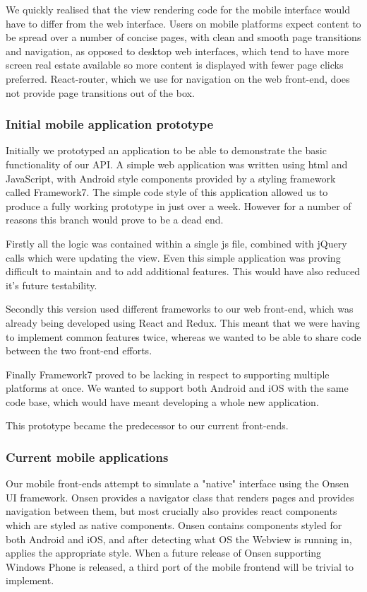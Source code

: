 We quickly realised that the view rendering code for the mobile interface would have to differ from the web interface. Users on mobile platforms expect content to be spread over a number of concise pages, with clean and smooth page transitions and navigation, as opposed to desktop web interfaces, which tend to have more screen real estate available so more content is displayed with fewer page clicks preferred. React-router, which we use for navigation on the web front-end, does not provide page transitions out of the box.

\subsubsection{Initial mobile application prototype}

Initially we prototyped an application to be able to demonstrate the basic functionality of our API. A simple web application was written using html and JavaScript, with Android style components provided by a styling framework called Framework7. The simple code style of this application allowed us to produce a fully working prototype in just over a week. However for a number of reasons this branch would prove to be a dead end. 

Firstly all the logic was contained within a single js file, combined with jQuery calls which were updating the view. Even this simple application was proving difficult to maintain and to add additional features. This would have also reduced it's future testability. 

Secondly this version used different frameworks to our web front-end, which was already being developed using React and Redux. This meant that we were having to implement common features twice, whereas we wanted to be able to share code between the two front-end efforts.

Finally Framework7 proved to be lacking in respect to supporting multiple platforms at once. We wanted to support both Android and iOS with the same code base, which would have meant developing a whole new application.

This prototype became the predecessor to our current front-ends.

\subsubsection{Current mobile applications}


Our mobile front-ends attempt to simulate a "native" interface using the Onsen UI framework. Onsen provides a navigator class that renders pages and provides navigation between them, but most crucially also provides react components which are styled as native components. Onsen contains components styled for both Android and iOS, and after detecting what OS the Webview is running in, applies the appropriate style. When a future release of Onsen supporting Windows Phone is released, a third port of the mobile frontend will be trivial to implement.


